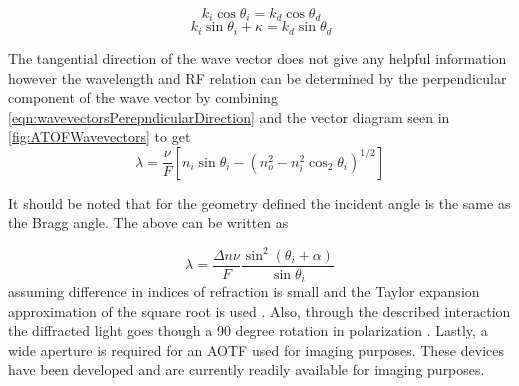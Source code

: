 \begin{equation}
    \ k_{i}\cos\theta_{i} = {k}_{d}\cos\theta_{d}
    \label{eqn:wavevectorsTangentalDirection}
\end{equation}
\begin{equation}
    \ k_{i}\sin\theta_{i} + \kappa = {k}_{d}\sin\theta_{d}
    \label{eqn:wavevectorsPerepndicularDirection}
\end{equation}


The tangential direction of the wave vector does not give any helpful information however the wavelength and RF relation can be determined by the perpendicular component of the wave vector by combining \autoref{eqn:wavevectorsPerepndicularDirection} and the vector diagram seen in \autoref{fig:ATOFWavevectors} to get
\begin{equation}
    \lambda  = \frac{\nu}{F}[n_{i}\sin\theta_{i}-(n_{o}^{2}-n_{i}^{2}\cos_{2}\theta_{i})^{1/2}]
    \label{eqn:initialAOTFWavelengthDependance}
\end{equation}

It should be noted that for the geometry defined the incident angle is the same as the Bragg angle. The above can be written as

\begin{equation}
    \lambda  = \frac{\Delta n\nu}{F}\frac{\sin^{2}(\theta_{i}+\alpha)}{\sin\theta_{i}}
    \label{eqn:AOTFWavelengthDependance}
\end{equation}
assuming difference in indices of refraction is small and the Taylor expansion approximation of the square root is used \citep{Voloshinov2006}. Also, through the described interaction the diffracted light goes though a 90 degree rotation in polarization \citep{Voloshinov1996}. Lastly, a wide aperture is required for an AOTF used for imaging purposes. These devices have been developed \citep{Gass1991} and are currently readily available for imaging purposes.

